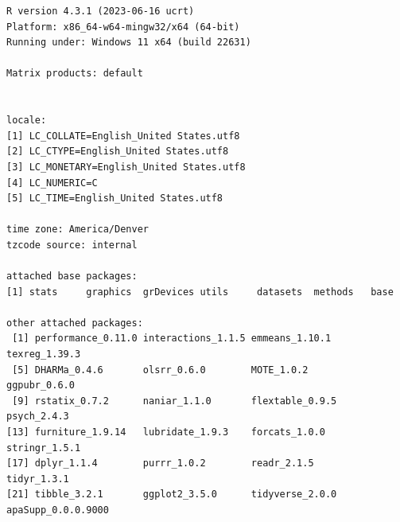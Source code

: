 \documentclass[
]{article}
\begin{document}
\begin{verbatim}
R version 4.3.1 (2023-06-16 ucrt)
Platform: x86_64-w64-mingw32/x64 (64-bit)
Running under: Windows 11 x64 (build 22631)

Matrix products: default


locale:
[1] LC_COLLATE=English_United States.utf8 
[2] LC_CTYPE=English_United States.utf8   
[3] LC_MONETARY=English_United States.utf8
[4] LC_NUMERIC=C                          
[5] LC_TIME=English_United States.utf8    

time zone: America/Denver
tzcode source: internal

attached base packages:
[1] stats     graphics  grDevices utils     datasets  methods   base     

other attached packages:
 [1] performance_0.11.0 interactions_1.1.5 emmeans_1.10.1     texreg_1.39.3     
 [5] DHARMa_0.4.6       olsrr_0.6.0        MOTE_1.0.2         ggpubr_0.6.0      
 [9] rstatix_0.7.2      naniar_1.1.0       flextable_0.9.5    psych_2.4.3       
[13] furniture_1.9.14   lubridate_1.9.3    forcats_1.0.0      stringr_1.5.1     
[17] dplyr_1.1.4        purrr_1.0.2        readr_2.1.5        tidyr_1.3.1       
[21] tibble_3.2.1       ggplot2_3.5.0      tidyverse_2.0.0    apaSupp_0.0.0.9000


\end{verbatim}
\end{document}

